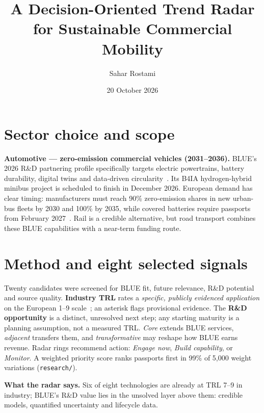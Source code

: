 \documentclass[11pt,a4paper]{article}
\title{A Decision-Oriented Trend Radar for Sustainable Commercial Mobility}
\author{Sahar Rostami}
\date{20 October 2026}
\begin{document}
\maketitle

\section{Sector choice and scope}
\textbf{Automotive --- zero-emission commercial vehicles (2031--2036).}
BLUE's 2026 R\&D partnering profile specifically targets electric powertrains, battery durability, digital twins and data-driven circularity~\cite{blue}. Its B4IA hydrogen-hybrid minibus project is scheduled to finish in December 2026. European demand has clear timing: manufacturers must reach 90\% zero-emission shares in new urban-bus fleets by 2030 and 100\% by 2035, while covered batteries require passports from February 2027~\cite{reg}. Rail is a credible alternative, but road transport combines these BLUE capabilities with a near-term funding route.

\section{Method and eight selected signals}
Twenty candidates were screened for BLUE fit, future relevance, R\&D potential and source quality. \textbf{Industry TRL} rates a \emph{specific, publicly evidenced application} on the European 1--9 scale~\cite{reg}; an asterisk flags provisional evidence. The \textbf{R\&D opportunity} is a distinct, unresolved next step; any starting maturity is a planning assumption, not a measured TRL. \emph{Core} extends BLUE services, \emph{adjacent} transfers them, and \emph{transformative} may reshape how BLUE earns revenue. Radar rings recommend action: \emph{Engage now}, \emph{Build capability}, or \emph{Monitor}. A weighted priority score ranks passports first in 99\% of 5{,}000 weight variations (\texttt{research/}).

\begin{table}[h!]
\centering
\caption{TRL at industry state of the art (* provisional). Each entry's sources and limitations are in \texttt{data/trends.json}.}
\end{table}

\clearpage
\noindent\textbf{What the radar says.} Six of eight technologies are already at TRL 7--9 in industry; BLUE's R\&D value lies in the unsolved layer above them: credible models, quantified uncertainty and lifecycle data.
\end{document}
